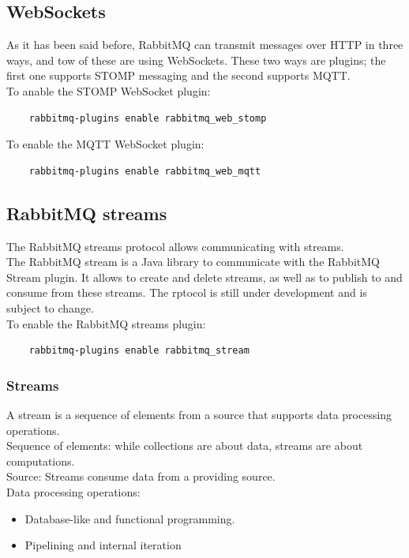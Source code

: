\documentclass[12pt]{article}
\begin{document}
\subsection*{WebSockets}
As it has been said before, RabbitMQ can transmit messages over HTTP in three ways, and tow of these are using WebSockets. These two ways are plugins; the first one supports STOMP messaging and the second supports MQTT.\\
To anable the STOMP WebSocket plugin:
\begin{lstlisting}
    rabbitmq-plugins enable rabbitmq_web_stomp
\end{lstlisting}
To enable the MQTT WebSocket plugin:
\begin{lstlisting}
    rabbitmq-plugins enable rabbitmq_web_mqtt
\end{lstlisting}

\subsection*{RabbitMQ streams}
The RabbitMQ streams protocol allows communicating with streams.\\
The RabbitMQ stream is a Java library to communicate with the RabbitMQ Stream plugin. It allows to create and delete streams, as well as to publish to and consume from these streams. The rptocol is still under development and is subject to change.\\
To enable the RabbitMQ streams plugin:
\begin{lstlisting}
    rabbitmq-plugins enable rabbitmq_stream
\end{lstlisting}

\subsubsection*{Streams}
A stream is a sequence of elements from a source that supports data processing operations.\\
Sequence of elements: while collections are about data, streams are about computations.\\
Source: Streams consume data from a providing source.\\
Data processing operations:

\begin{itemize}
    \item Database-like and functional programming.
    \item Pipelining and internal iteration
\end{itemize}
\end{document}
